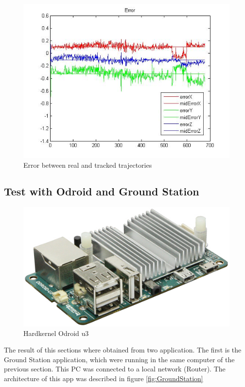 	\begin{figure}[htp]
		\centering
		\includegraphics[width=0.7\linewidth]{../Images/c4/errors_stereo}
		\caption{Error between real and tracked trajectories}
		\label{fig:errors_stereo_PC}
	\end{figure}	
	
	\newpage
	
\subsection{Test with Odroid and Ground Station}
	\label{test_with_odroid_and_GT}
	
	\begin{figure}
		\includegraphics[width=\linewidth]{../Images/c4/odroidu3}
		\caption{Hardkernel Odroid u3}
		\label{fig:odroidu3}
	\end{figure}
		
	The result of this sections where obtained from two application. The first is the Ground Station application, which were running in the same computer of the previous section. This PC was connected to a local network (Router). The architecture of this app  was described in figure \ref{fig:GroundStation}
	
